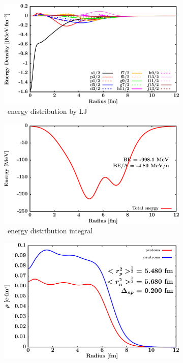 \begin{figure}[hbtp]
    \begin{subfigure}{0.45\textwidth}
        \centering
        \includegraphics[width=\linewidth]{figures/pb208_EnergyDist.png}
        \caption{\pbEight\ energy distribution by LJ}
        \label{DOMFitData_pb208_proton_energyDistInt}
    \end{subfigure}\hspace{6pt}
    \begin{subfigure}{0.45\textwidth}
        \centering
        \includegraphics[width=\linewidth]{figures/pb208_EnergyDistIntegral.png}
        \caption{\pbEight\ energy distribution integral}
        \label{DOMFitData_pb208_neutron_energyDistInt}
    \end{subfigure}\vspace{0.4in}
    \begin{subfigure}{0.70\textwidth}
        \centering
        \includegraphics[width=\linewidth]{figures/pb208_matterDensity.png}

\end{subfigure}
\end{figure}
